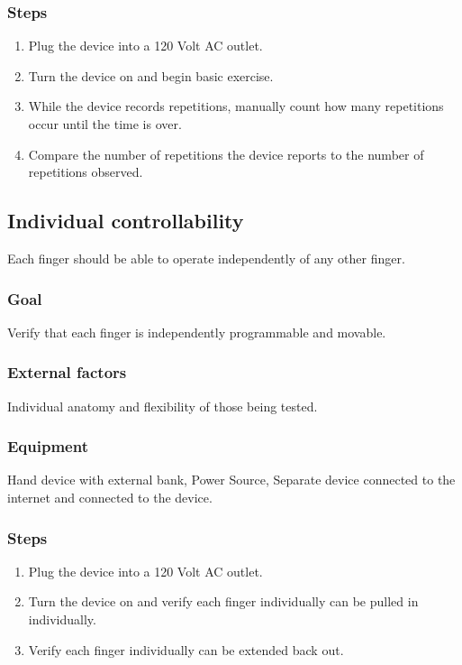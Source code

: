 \documentclass{article}
\begin{document}
\subsubsection{Steps}
\begin{enumerate}
\item Plug the device into a 120 Volt AC outlet.
\item Turn the device on and begin basic exercise.
\item While the device records repetitions, manually count how many repetitions occur until the time is over.
\item Compare the number of repetitions the device reports to the number of repetitions observed.
\end{enumerate}

\subsection{Individual controllability}
Each finger should be able to operate independently of any other finger.

\subsubsection{Goal} Verify that each finger is independently programmable and movable.

\subsubsection{External factors} Individual anatomy and flexibility of those being tested.

\subsubsection{Equipment} Hand device with external bank, Power Source, Separate device connected to the internet and connected to the device.

\subsubsection{Steps}
\begin{enumerate}
\item Plug the device into a 120 Volt AC outlet.
\item Turn the device on and verify each finger individually can be pulled in individually.
\item Verify each finger individually can be extended back out.
\end{enumerate}
\end{document}
